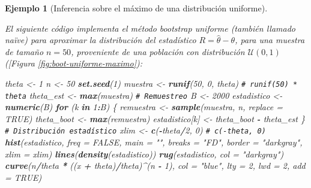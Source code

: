 \documentclass[
  spanish,
  10pt,
]{book}
\newenvironment{Shaded}{\begin{snugshade}}{\end{snugshade}}
\newcommand{\AttributeTok}[1]{\textcolor[rgb]{0.13,0.29,0.53}{#1}}
\newcommand{\CommentTok}[1]{\textcolor[rgb]{0.56,0.35,0.01}{\textit{#1}}}
\newcommand{\ConstantTok}[1]{\textcolor[rgb]{0.56,0.35,0.01}{#1}}
\newcommand{\ControlFlowTok}[1]{\textcolor[rgb]{0.13,0.29,0.53}{\textbf{#1}}}
\newcommand{\DecValTok}[1]{\textcolor[rgb]{0.00,0.00,0.81}{#1}}
\newcommand{\FunctionTok}[1]{\textcolor[rgb]{0.13,0.29,0.53}{\textbf{#1}}}
\newcommand{\NormalTok}[1]{#1}
\newcommand{\OtherTok}[1]{\textcolor[rgb]{0.56,0.35,0.01}{#1}}
\newcommand{\SpecialCharTok}[1]{\textcolor[rgb]{0.81,0.36,0.00}{\textbf{#1}}}
\newcommand{\StringTok}[1]{\textcolor[rgb]{0.31,0.60,0.02}{#1}}
\theoremstyle{break}
\newtheorem{example}{Ejemplo}[chapter]
\theoremstyle{nonumberplain}
\renewcommand{\CommentTok}[1]{\textcolor[rgb]{0.41,0.41,0.41}{\texttt{#1}}}
\begin{document}
\begin{example}[Inferencia sobre el máximo de una distribución uniforme]
\protect\hypertarget{exm:boot-maximo-uniforme}{}\label{exm:boot-maximo-uniforme}

El siguiente código implementa el método bootstrap uniforme (también llamado naïve) para aproximar la distribución del estadístico \(R=\hat{\theta}-\theta\), para una muestra de tamaño \(n=50\), proveniente de una población con distribución
\(\mathcal{U}\left( 0,1\right)\) ({[}Figura \ref{fig:boot-uniforme-maximo}):

\begin{Shaded}
\begin{Highlighting}[]
\NormalTok{theta }\OtherTok{\textless{}{-}} \DecValTok{1}
\NormalTok{n }\OtherTok{\textless{}{-}} \DecValTok{50}
\FunctionTok{set.seed}\NormalTok{(}\DecValTok{1}\NormalTok{)}
\NormalTok{muestra }\OtherTok{\textless{}{-}} \FunctionTok{runif}\NormalTok{(}\DecValTok{50}\NormalTok{, }\DecValTok{0}\NormalTok{, theta) }\CommentTok{\# runif(50) * theta}
\NormalTok{theta\_est }\OtherTok{\textless{}{-}} \FunctionTok{max}\NormalTok{(muestra)}
\CommentTok{\# Remuestreo}
\NormalTok{B }\OtherTok{\textless{}{-}} \DecValTok{2000}
\NormalTok{estadistico }\OtherTok{\textless{}{-}} \FunctionTok{numeric}\NormalTok{(B)}
\ControlFlowTok{for}\NormalTok{ (k }\ControlFlowTok{in} \DecValTok{1}\SpecialCharTok{:}\NormalTok{B) \{}
\NormalTok{    remuestra }\OtherTok{\textless{}{-}} \FunctionTok{sample}\NormalTok{(muestra, n, }\AttributeTok{replace =} \ConstantTok{TRUE}\NormalTok{)}
\NormalTok{    theta\_boot }\OtherTok{\textless{}{-}} \FunctionTok{max}\NormalTok{(remuestra)}
\NormalTok{    estadistico[k] }\OtherTok{\textless{}{-}}\NormalTok{ theta\_boot }\SpecialCharTok{{-}}\NormalTok{ theta\_est}
\NormalTok{\}}
\CommentTok{\# Distribución estadístico}
\NormalTok{xlim }\OtherTok{\textless{}{-}} \FunctionTok{c}\NormalTok{(}\SpecialCharTok{{-}}\NormalTok{theta}\SpecialCharTok{/}\DecValTok{2}\NormalTok{, }\DecValTok{0}\NormalTok{) }\CommentTok{\# c({-}theta, 0)}
\FunctionTok{hist}\NormalTok{(estadistico, }\AttributeTok{freq =} \ConstantTok{FALSE}\NormalTok{, }\AttributeTok{main =} \StringTok{""}\NormalTok{, }\AttributeTok{breaks =} \StringTok{"FD"}\NormalTok{,  }
     \AttributeTok{border =} \StringTok{"darkgray"}\NormalTok{, }\AttributeTok{xlim =}\NormalTok{ xlim)}
\FunctionTok{lines}\NormalTok{(}\FunctionTok{density}\NormalTok{(estadistico))}
\FunctionTok{rug}\NormalTok{(estadistico, }\AttributeTok{col =} \StringTok{"darkgray"}\NormalTok{)}
\FunctionTok{curve}\NormalTok{(n}\SpecialCharTok{/}\NormalTok{theta }\SpecialCharTok{*}\NormalTok{ ((x }\SpecialCharTok{+}\NormalTok{ theta)}\SpecialCharTok{/}\NormalTok{theta)}\SpecialCharTok{\^{}}\NormalTok{(n }\SpecialCharTok{{-}} \DecValTok{1}\NormalTok{), }\AttributeTok{col =} \StringTok{"blue"}\NormalTok{, }\AttributeTok{lty =} \DecValTok{2}\NormalTok{, }\AttributeTok{lwd =} \DecValTok{2}\NormalTok{, }
      \AttributeTok{add =} \ConstantTok{TRUE}\NormalTok{)}
\end{Highlighting}
\end{Shaded}


\end{example}
\end{document}
